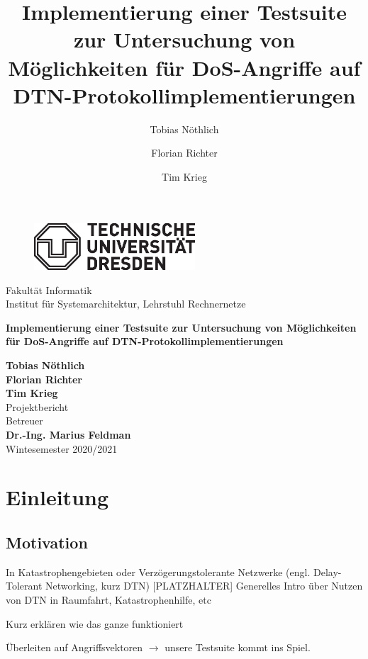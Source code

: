 \documentclass{article}
\author[1]{Tobias Nöthlich}
\author[1]{Florian Richter}
\author[1]{Tim Krieg}
\title{Implementierung einer Testsuite zur Untersuchung von Möglichkeiten für DoS-Angriffe auf DTN-Protokollimplementierungen}
\begin{document}


\begin{titlepage}

\begin{figure}[h]
\begin{flushleft}
\includegraphics[trim= 0 0 0 0 , clip, width=6cm]{img/logo.eps} 
\end{flushleft}
\end{figure}
\noindent
Fakultät Informatik\\
Institut für Systemarchitektur, Lehrstuhl Rechnernetze \\

\begin{center}
\Huge
\textbf{Implementierung einer Testsuite zur Untersuchung von Möglichkeiten für DoS-Angriffe auf DTN-Protokollimplementierungen} \\
\normalsize
\vspace{1cm}

\end{center}

\vspace{1cm}
\noindent
\textbf{\large{Tobias Nöthlich}} \\
\textbf{\large{Florian Richter}} \\
\textbf{\large{Tim Krieg}} \\

\vspace{1cm}
\noindent
{\LARGE Projektbericht} \\

\vspace{1cm}
\noindent
Betreuer\\
\textbf{\large{Dr.-Ing. Marius Feldman}} \\

\vspace{1cm}
\noindent
Wintesemester 2020/2021

\end{titlepage}
\tableofcontents

\newpage

\section{Einleitung}

\subsection{Motivation}
In Katastrophengebieten oder Verzögerungstolerante Netzwerke (engl. Delay-Tolerant Networking, kurz DTN)  
[PLATZHALTER] Generelles Intro über Nutzen von DTN in Raumfahrt, Katastrophenhilfe, etc \par
[PLATZHALTER] Kurz erklären wie das ganze funktioniert\par
[PLATZHALTER]Überleiten auf Angriffsvektoren $\rightarrow$ unsere Testsuite kommt ins Spiel.\par
\end{document}
